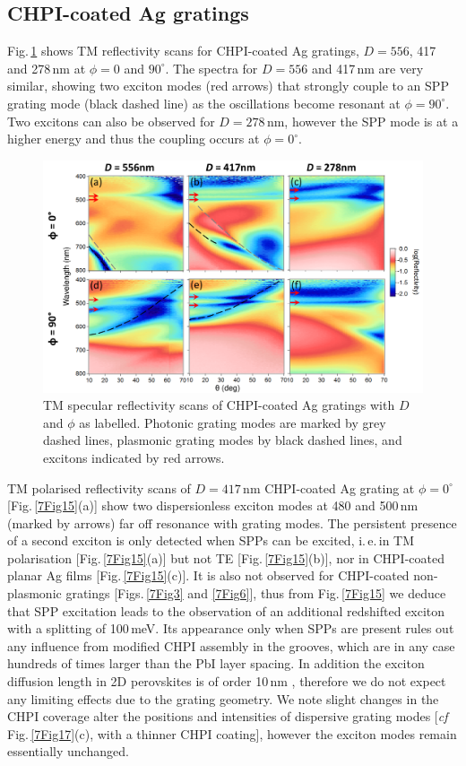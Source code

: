 \subsection{CHPI-coated Ag gratings}
Fig.\,\ref{7Fig14} shows TM reflectivity scans for CHPI-coated Ag gratings, $D=556$, 417 and 278\,nm at $\phi=0$ and $90^{\circ}$. The spectra for $D=556$ and 417\,nm are very similar, showing two exciton modes (red arrows) that strongly couple to an SPP grating mode (black dashed line) as the oscillations become resonant at $\phi=90^{\circ}$. Two excitons can also be observed for $D=278$\,nm, however the SPP mode is at a higher energy and thus the coupling occurs at $\phi=0^{\circ}$.
\begin{figure}[h!] 
\centering    
\includegraphics[width=\textwidth]{Fig14}
\caption{TM specular reflectivity scans of CHPI-coated Ag gratings with $D$ and $\phi$ as labelled. Photonic grating modes are marked by grey dashed lines, plasmonic grating modes by black dashed lines, and excitons indicated by red arrows.}
\label{7Fig14}
\end{figure}

TM polarised reflectivity scans of $D=417$\,nm CHPI-coated Ag grating at $\phi=0^{\circ}$ [Fig.\,\ref{7Fig15}(a)] show two dispersionless exciton modes at 480 and 500\,nm (marked by arrows) far off resonance with grating modes. The persistent presence of a second exciton is only detected when SPPs can be excited, i.\,e.\,in TM polarisation [Fig.\,\ref{7Fig15}(a)] but not TE [Fig.\,\ref{7Fig15}(b)], nor in CHPI-coated planar Ag films [Fig.\,\ref{7Fig15}(c)]. It is also not observed for CHPI-coated non-plasmonic gratings [Figs.\,\ref{7Fig3} and \ref{7Fig6}], thus from Fig.\,\ref{7Fig15} we deduce that SPP excitation leads to the observation of an additional redshifted exciton with a splitting of 100\,meV. Its appearance only when SPPs are present rules out any influence from modified CHPI assembly in the grooves, which are in any case hundreds of times larger than the PbI layer spacing. In addition the exciton diffusion length in 2D perovskites is of order 10\,nm \cite{Ahmad2013}, therefore we do not expect any limiting effects due to the grating geometry. We note slight changes in the CHPI coverage alter the positions and intensities of dispersive grating modes [\textit{cf} Fig.\,\ref{7Fig17}(c), with a thinner CHPI coating], however the exciton modes remain essentially unchanged.


